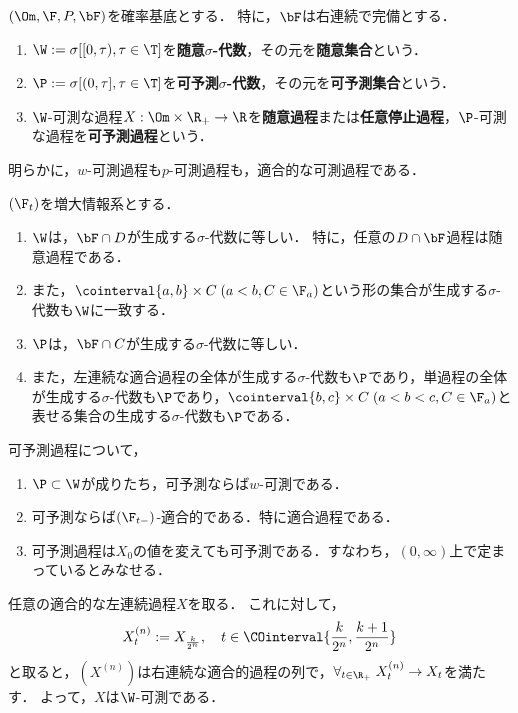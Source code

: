 \documentclass[uplatex,dvipdfmx]{jsreport}
\begin{document}
\begin{definition}
    $(\Om,\F,P,\bF)$を確率基底とする．
    特に，$\bF$は右連続で完備とする．
    \begin{enumerate}
        \item $\W:=\sigma[[0,\tau),\tau\in\T]$を\textbf{随意$\sigma$-代数}，その元を\textbf{随意集合}という．
        \item $\P:=\sigma[(0,\tau],\tau\in\T]$を\textbf{可予測$\sigma$-代数}，その元を\textbf{可予測集合}という．
        \item $\W$-可測な過程$X:\Om\times\R_+\to\R$を\textbf{随意過程}または\textbf{任意停止過程}，$\P$-可測な過程を\textbf{可予測過程}という．
    \end{enumerate}
    明らかに，$w$-可測過程も$p$-可測過程も，適合的な可測過程である．
\end{definition}

\begin{theorem}
    $(\F_t)$を増大情報系とする．
    \begin{enumerate}
        \item $\W$は，$\bF\cap D$が生成する$\sigma$-代数に等しい．
        特に，任意の$D\cap\bF$過程は随意過程である．
        \item また，$\cointerval{a,b}\times C\;(a<b,C\in\F_a)$という形の集合が生成する$\sigma$-代数も$\W$に一致する．
        \item $\P$は，$\bF\cap C$が生成する$\sigma$-代数に等しい．
        \item また，左連続な適合過程の全体が生成する$\sigma$-代数も$\P$であり，単過程の全体が生成する$\sigma$-代数も$\P$であり，$\cointerval{b,c}\times C\;(a<b<c,C\in\F_a)$と表せる集合の生成する$\sigma$-代数も$\P$である．
    \end{enumerate}
\end{theorem}

\begin{corollary}
    可予測過程について，
    \begin{enumerate}
        \item $\P\subset\W$が成りたち，可予測ならば$w$-可測である．
        \item 可予測ならば$(\F_{t-})$-適合的である．特に適合過程である．
        \item 可予測過程は$X_0$の値を変えても可予測である．すなわち，$(0,\infty)$上で定まっているとみなせる．
    \end{enumerate}
\end{corollary}
\begin{Proof}
    任意の適合的な左連続過程$X$を取る．
    これに対して，
    \[X_t^{(n)}:=X_{\frac{k}{2^n}},\quad t\in\COinterval{\frac{k}{2^n},\frac{k+1}{2^n}}\]
    と取ると，$(X^{(n)})$は右連続な適合的過程の列で，$\forall_{t\in\R_+}\;X_t^{(n)}\to X_t$を満たす．
    よって，$X$は$\W$-可測である．
\end{Proof}
\end{document}
